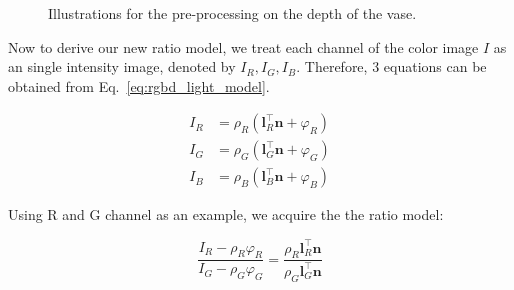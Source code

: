 \begin{figure}[!htbp]
\centering
{}
\caption{Illustrations for the pre-processing on the depth of the vase.}
\label{fig:ratio_setup}
\end{figure}


Now to derive our new ratio model, we treat each channel of the color image $I$ as an single intensity image, denoted by $I_R, I_G, I_B$.
Therefore, 3 equations can be obtained from Eq.~\ref{eq:rgbd_light_model}.

\begin{equation}\label{eq:ratio_prepare}
    \begin{split}
	I_R &= \rho_R(\mathbf{l}_R^\top \mathbf{n} + \varphi_R)\\
	I_G &= \rho_G(\mathbf{l}_G^\top \mathbf{n} + \varphi_G)\\
	I_B &= \rho_B(\mathbf{l}_B^\top \mathbf{n} + \varphi_B)
    \end{split}
\end{equation}

Using R and G channel as an example, we acquire the the ratio model:

\begin{equation}\label{eq:ratio_rg_sh1}
\frac{I_R - \rho_R \varphi_R}{I_G - \rho_G \varphi_G} = \frac{\rho_R \mathbf{l}_R^\top \mathbf{n}}{\rho_G \mathbf{l}_G^\top \mathbf{n}}
\end{equation}

